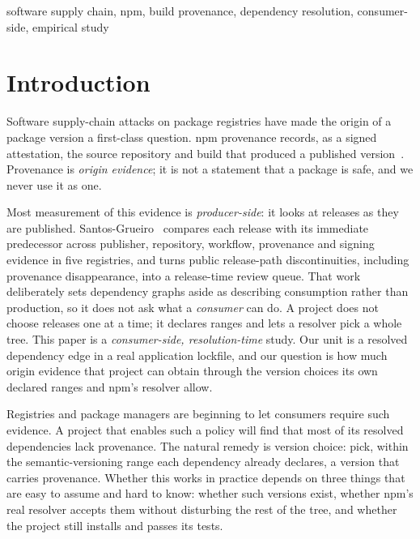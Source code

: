 \documentclass[conference]{IEEEtran}
\begin{document}
\begin{IEEEkeywords}
software supply chain, npm, build provenance, dependency resolution, consumer-side, empirical study
\end{IEEEkeywords}

\section{Introduction}

Software supply-chain attacks on package registries have made the origin of a
package version a first-class question. npm provenance records, as a signed
attestation, the source repository and build that produced a published
version~\cite{npmprovenance2023}. Provenance is \emph{origin evidence}; it is
not a statement that a package is safe, and we never use it as one.

Most measurement of this evidence is \emph{producer-side}: it looks at
releases as they are published. Santos-Grueiro~\cite{santos2026authority}
compares each release with its immediate predecessor across publisher,
repository, workflow, provenance and signing evidence in five registries, and
turns public release-path discontinuities, including provenance
disappearance, into a release-time review queue. That work deliberately sets
dependency graphs aside as describing consumption rather than production, so
it does not ask what a \emph{consumer} can do. A project does not choose
releases one at a time; it declares ranges and lets a resolver pick a whole
tree. This paper is a \emph{consumer-side, resolution-time} study. Our unit is
a resolved dependency edge in a real application lockfile, and our question is
how much origin evidence that project can obtain through the version choices
its own declared ranges and npm's resolver allow.

Registries and package managers are beginning to let consumers require such
evidence. A project that enables such a policy will find that most of its
resolved dependencies lack provenance. The natural remedy is version choice:
pick, within the semantic-versioning range each dependency already declares,
a version that carries provenance. Whether this works in practice depends on
three things that are easy to assume and hard to know: whether such versions
exist, whether npm's real resolver accepts them without disturbing the rest
of the tree, and whether the project still installs and passes its tests.
\end{document}
